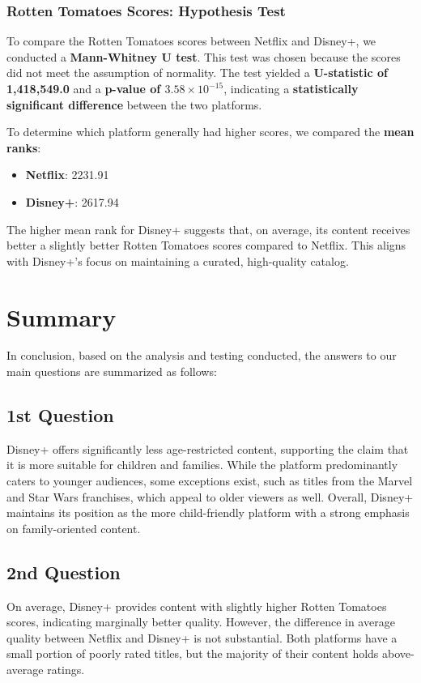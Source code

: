 \documentclass[a4paper, 12pt]{article}
\begin{document}
\subsubsection{Rotten Tomatoes Scores: Hypothesis Test}
To compare the Rotten Tomatoes scores between Netflix and Disney+, we conducted a \textbf{Mann-Whitney U test}. This test was chosen because the scores did not meet the assumption of normality. The test yielded a \textbf{U-statistic of 1,418,549.0} and a \textbf{p-value of \(3.58 \times 10^{-15}\)}, indicating a \textbf{statistically significant difference} between the two platforms.

To determine which platform generally had higher scores, we compared the \textbf{mean ranks}:
\begin{itemize}
    \item \textbf{Netflix}: 2231.91
    \item \textbf{Disney+}: 2617.94
\end{itemize}

The higher mean rank for Disney+ suggests that, on average, its content receives better a slightly better Rotten Tomatoes scores compared to Netflix. This aligns with Disney+’s focus on maintaining a curated, high-quality catalog.

\section{Summary}
In conclusion, based on the analysis and testing conducted, the answers to our main questions are summarized as follows:

\subsection{1st Question}
Disney+ offers significantly less age-restricted content, supporting the claim that it is more suitable for children and families. While the platform predominantly caters to younger audiences, some exceptions exist, such as titles from the Marvel and Star Wars franchises, which appeal to older viewers as well. Overall, Disney+ maintains its position as the more child-friendly platform with a strong emphasis on family-oriented content.

\subsection{2nd Question}
On average, Disney+ provides content with slightly higher Rotten Tomatoes scores, indicating marginally better quality. However, the difference in average quality between Netflix and Disney+ is not substantial. Both platforms have a small portion of poorly rated titles, but the majority of their content holds above-average ratings.
\end{document}
